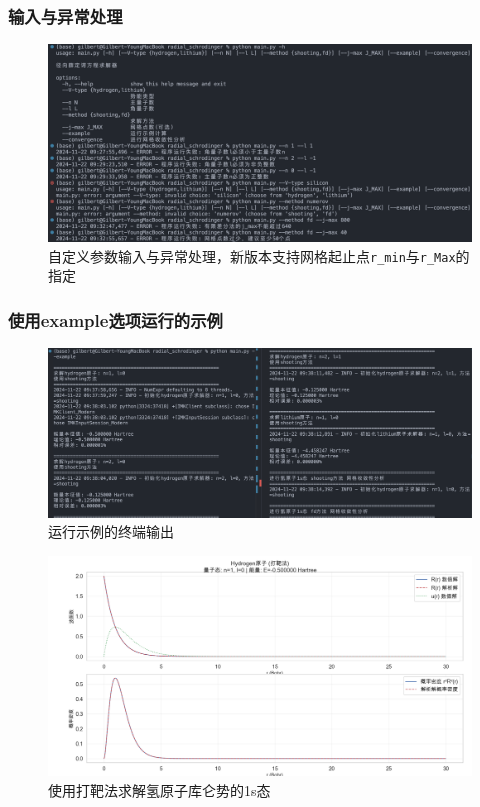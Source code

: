 \subsubsection{输入与异常处理}
\begin{figure}[H]
    \centering
    \includegraphics[width=1.0\textwidth]{Problem_2/figs/error-terminal.png}
    \caption{自定义参数输入与异常处理，新版本支持网格起止点\texttt{r\_min}与\texttt{r\_Max}的指定}
\end{figure}

\subsubsection{使用example选项运行的示例}
\begin{figure}[H]
    \centering
    \includegraphics[width=1.0\textwidth]{Problem_2/figs/example-terminal.png}
    \caption{运行示例的终端输出}
\end{figure}

\begin{figure}[H]
    \centering
    \includegraphics[width=1.0\textwidth]{Problem_2/figs/example_h_shooting_1s.png}
    \caption{使用打靶法求解氢原子库仑势的1s态}
\end{figure}

